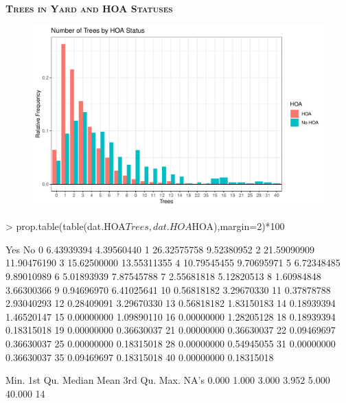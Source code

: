 \documentclass{article}
\begin{document}
\newpage
\textsc{\textbf{Trees in Yard and HOA Statuses}}
\newline
\newline
\begin{figure}[H]
		\centering
\includegraphics{exam23-019}
		\label{Fig:plot6}
	\end{figure}
\begin{Schunk}
\begin{Sinput}
> prop.table(table(dat.HOA$Trees, dat.HOA$HOA),margin=2)*100
\end{Sinput}
\begin{Soutput}
             Yes          No
  0   6.43939394  4.39560440
  1  26.32575758  9.52380952
  2  21.59090909 11.90476190
  3  15.62500000 13.55311355
  4  10.79545455  9.70695971
  5   6.72348485  9.89010989
  6   5.01893939  7.87545788
  7   2.55681818  5.12820513
  8   1.60984848  3.66300366
  9   0.94696970  6.41025641
  10  0.56818182  3.29670330
  11  0.37878788  2.93040293
  12  0.28409091  3.29670330
  13  0.56818182  1.83150183
  14  0.18939394  1.46520147
  15  0.00000000  1.09890110
  16  0.00000000  1.28205128
  18  0.18939394  0.18315018
  19  0.00000000  0.36630037
  21  0.00000000  0.36630037
  22  0.09469697  0.36630037
  25  0.00000000  0.18315018
  28  0.00000000  0.54945055
  31  0.00000000  0.36630037
  35  0.09469697  0.18315018
  40  0.00000000  0.18315018
\end{Soutput}
\begin{Soutput}
   Min. 1st Qu.  Median    Mean 3rd Qu.    Max.    NA's 
  0.000   1.000   3.000   3.952   5.000  40.000      14 
\end{Soutput}
\end{Schunk}
\end{document}
